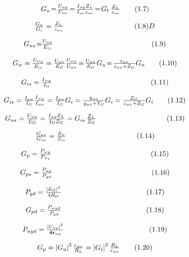 \documentclass{article}
\begin{document}
\[
$$
G_{u} \!=\! \frac{U_{u y}} {U_{u c}} \!=\! \frac{I_{u y} Z_{L}} {I_{u e} z_{u c}} \!=\! G_{t} \, \frac{Z_{L}} {z_{u e}} \tag{1.7}
$$
\]

\[
$$
\frac{G_{u}} {G_{i}}=\frac{Z_{L}} {z_{u v}} \qquad\qquad\qquad\qquad\qquad( 1. 8 )
$$
D
\]

\[
$$
G_{u s} \!=\! \! {\frac{U_{u y}} {E_{( i}}} \qquad\qquad\qquad\qquad\qquad\qquad\qquad( 1. 9 )
$$
\]

\[
$$
G_{w}=\frac{U_{w y}} {E_{( i}}=\frac{U_{w e}} {E_{G}} \frac{U_{w y}} {U_{w e}} \!=\! \frac{U_{w e}} {E_{G}} G_{u} \!=\! \frac{z_{w e}} {z_{w e}+Z_{G}} G_{u} \tag{1.10}
$$
\]

\[
$$
G_{i s}=\frac{I_{w y}} {I_{G}} \qquad\qquad\qquad\qquad\qquad\qquad\qquad( 1. 1 1 )
$$
\]

\[
$$
G_{i s}={\frac{I_{w e}} {I_{G}}} {\frac{I_{w y}} {I_{w e}}}={\frac{I_{w e}} {I_{G}}} G_{i}={\frac{y_{w e}} {y_{w e}+Y_{G}}} G_{i}={\frac{Z_{G}} {z_{w e}+Z_{G}}} G_{i} \tag{1.12}
$$
\]

\[
$$
G_{u s}={\frac{U_{u y}} {E_{G}}}={\frac{I_{u y} Z_{L}} {I_{G} Z_{G}}}=G_{i s} \, {\frac{Z_{L}} {Z_{G}}} \qquad\qquad\qquad\qquad\qquad( 1. 1 3 )
$$
\]

\[
$$
{\frac{G_{u s}} {G_{i n}}}={\frac{Z_{L}} {Z_{i i}}} \qquad\qquad\qquad\qquad\qquad( 1. 1 4 )
$$
\]

\[
$$
G_{p}={\frac{P_{w y}} {P_{w_{t}}}} \qquad\qquad\qquad\qquad\qquad\qquad\qquad( 1. 1 5 )
$$
\]

\[
$$
G_{p s}={\frac{P_{u y}} {P_{g d}}} \qquad\qquad\qquad\qquad\qquad\qquad\qquad( 1. 1 6 )
$$
\]

\[
$$
P_{g d}={\frac{\left| E_{G} \right|^{2}} {4 R_{G}}} \qquad\qquad\qquad\qquad\qquad\qquad( 1. 1 7 )
$$
\]

\[
$$
G_{p d}=\frac{P_{w y d}} {P_{g d}} \qquad\qquad\qquad\qquad\qquad\qquad( 1. 1 8 )
$$
\]

\[
$$
P_{u y d}={\frac{\left| U_{u y} \right|^{2}} {{\bf4 r}_{u y}}} \qquad\qquad\qquad\qquad\qquad\qquad( 1. 1 9 )
$$
\]

\[
$$
G_{p}=\left| G_{u} \right|^{2} \frac{r_{w e}} {R_{L}}=\left| G_{i} \right|^{2} \frac{R_{L}} {r_{w e}} \tag{1.20}
$$
\]
\end{document}
